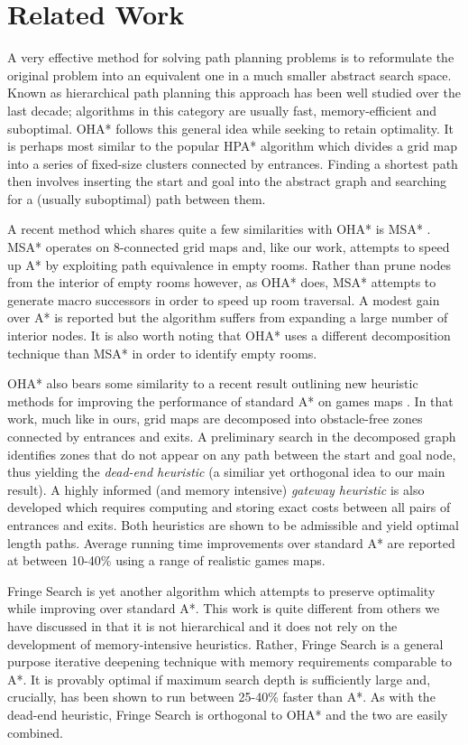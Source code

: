 \section{Related Work}
A very effective method for solving path planning problems is to reformulate the original problem
into an equivalent one in a much smaller abstract search space. 
Known as hierarchical path planning this approach has been well studied over the last decade;
algorithms in this category are usually fast, memory-efficient and suboptimal.
OHA* follows this general idea while seeking to retain optimality.
It is perhaps most similar to the popular HPA* algorithm \cite{botea04} 
which divides a grid map into a series of fixed-size clusters connected 
by entrances.
Finding a shortest path then involves inserting the start and goal into the 
abstract graph and searching for a (usually suboptimal) path between them.
\par
A recent method which shares quite a few similarities with OHA* is MSA* \cite{bolanca09}.
MSA* operates on 8-connected grid maps and, like our work,
 attempts to speed up A* by exploiting path equivalence in empty rooms.
Rather than prune nodes from the interior of empty rooms however, as OHA* does,
MSA* attempts to generate macro successors 
in order to speed up room traversal. 
A modest gain over A* is reported but the algorithm suffers from 
expanding a large number of interior nodes. 
It is also worth noting that OHA* uses a different decomposition technique 
than MSA* in order to identify empty rooms. 
\par
OHA* also bears some similarity to a recent result outlining new heuristic methods for improving the 
performance of standard A* on games maps \cite{bjornsson06}.
In that work, much like in ours, grid maps are decomposed into obstacle-free zones connected by entrances 
and exits. 
A preliminary search in the decomposed graph identifies zones that do not appear 
on any path between the start and goal node, thus yielding the \emph{dead-end heuristic} 
(a similiar yet orthogonal idea to our main result).
A highly informed (and memory intensive) \emph{gateway heuristic} is also developed which 
requires computing and storing exact costs between all pairs of entrances and exits.
Both heuristics are shown to be admissible and yield optimal length paths. 
Average running time improvements over standard A* are reported at between 10-40\% using a range of
realistic games maps.
\par
Fringe Search is yet another algorithm which attempts to preserve optimality
while improving over standard A*.
This work is quite different from others we have discussed in that it is not 
hierarchical and it does not rely on the development of memory-intensive heuristics.
Rather, Fringe Search is a general purpose iterative deepening technique with memory requirements
comparable to A*. 
It is provably optimal if maximum search depth is sufficiently large and, crucially, has been shown to 
run between 25-40\% faster than A*.
As with the dead-end heuristic, Fringe Search is orthogonal to OHA* and the two
are easily combined.
